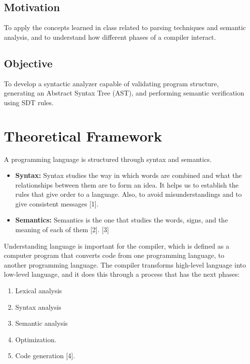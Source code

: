 \documentclass[letterpaper,12pt,oneside]{article}
\begin{document}
\subsection{Motivation}
To apply the concepts learned in class related to parsing techniques and semantic analysis, and to understand how different phases of a compiler interact.

\subsection{Objective}
To develop a syntactic analyzer capable of validating program structure, generating an Abstract Syntax Tree (AST), and performing semantic verification using SDT rules.


\section{Theoretical Framework}

A programming language is structured through syntax and semantics.

\begin{itemize}
    \item \textbf{Syntax:} Syntax studies the way in which words are combined and what the relationships between them are to form an idea. It helps us to establish the rules that give order to a language. Also, to avoid misunderstandings and to give consistent messages [1].  
    \item \textbf{Semantics:} Semantics is the one that studies the words, signs, and the meaning of each of them [2]. [3]
\end{itemize}

Understanding language is important for the compiler, which is defined as a computer program that converts code from one programming language, to another programming language. The compiler transforms high-level language into low-level language, and it does this through a process that has the next phases: 

\begin{enumerate}
    \item Lexical analysis
    \item Syntax analysis
    \item Semantic analysis
    \item Optimization.
    \item Code generation [4]. 
\end{enumerate}
\end{document}
